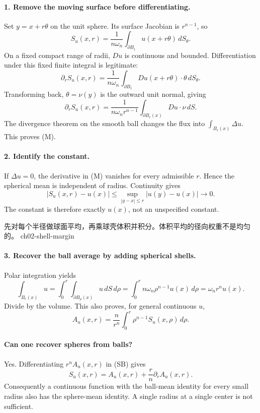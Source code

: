 \begin{expandedproof}
\paragraph{1. Remove the moving surface before differentiating.}
Set $y=x+r\theta$ on the unit sphere. Its surface Jacobian is $r^{n-1}$,
so
\[
 S_u(x,r)=\frac1{n\omega_n}\int_{\partial B_1}u(x+r\theta)\,dS_\theta.
\]
On a fixed compact range of radii, $Du$ is continuous and bounded.
Differentiation under this fixed finite integral is legitimate:
\[
 \partial_r S_u(x,r)
 =\frac1{n\omega_n}\int_{\partial B_1}Du(x+r\theta)\cdot\theta\,dS_\theta.
\]
Transforming back, $\theta=\nu(y)$ is the outward unit normal, giving
\[
 \partial_r S_u(x,r)
 =\frac1{n\omega_n r^{n-1}}
       \int_{\partial B_r(x)}Du\cdot\nu\,dS.
\]
The divergence theorem on the smooth ball changes the flux into
$\int_{B_r(x)}\Delta u$. This proves (M).

\paragraph{2. Identify the constant.}
If $\Delta u=0$, the derivative in (M) vanishes for every admissible $r$.
Hence the spherical mean is independent of radius.
Continuity gives
\[
 |S_u(x,r)-u(x)|
 \leq\sup_{|y-x|\leq r}|u(y)-u(x)|\longrightarrow0.
\]
The constant is therefore exactly $u(x)$, not an unspecified constant.


{先对每个半径做球面平均，再乘球壳体积并积分。体积平均的径向权重不是均匀的。}
{ch02-shell-margin}

\paragraph{3. Recover the ball average by adding spherical shells.}
Polar integration yields
\[
 \int_{B_r(x)}u
 =\int_0^r\int_{\partial B_\rho(x)}u\,dS\,d\rho
 =\int_0^r n\omega_n\rho^{n-1}u(x)\,d\rho
 =\omega_n r^n u(x).
\]
Divide by the volume. This also proves, for general continuous $u$,
\[
 A_u(x,r)=\frac n{r^n}\int_0^r \rho^{n-1}S_u(x,\rho)\,d\rho.
 \tag{SB}
\]
\end{expandedproof}
\Needspace{45mm}

\paragraph{Can one recover spheres from balls?}
Yes. Differentiating $r^nA_u(x,r)$ in (SB) gives
\[
 S_u(x,r)=A_u(x,r)+\frac r n\partial_r A_u(x,r).
\]
Consequently a continuous function with the ball-mean identity for every
small radius also has the sphere-mean identity. A single radius at a
single center is not sufficient.


